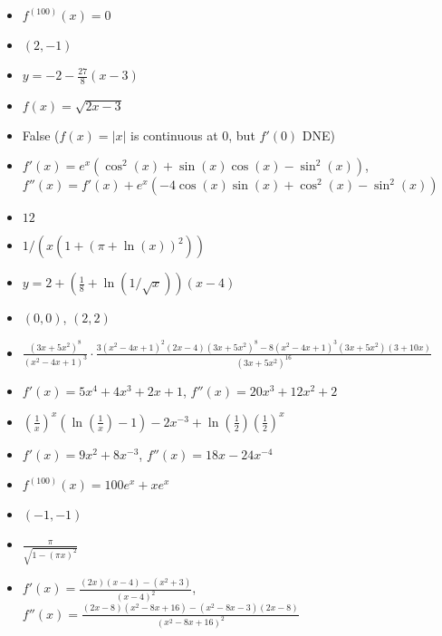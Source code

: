 \documentclass{article}
\begin{document}
\begin{itemize}
\item $f^{(100)}(x)=0$
\item $(2,-1)$
\item $y=-2-\frac{27}{8}(x-3)$
\item $f(x)=\sqrt{2x-3}$
\item False ($f(x)=|x|$ is continuous at $0$, but $f'(0)$ DNE)
\item $f'(x)=e^{x}(\cos^{2}(x)+\sin(x)\cos(x)-\sin^{2}(x))$, \\$f''(x)=f'(x)+e^{x}\left(-4\cos\left(x\right)\sin\left(x\right)+\cos^{2}\left(x\right)-\sin^{2}\left(x\right)\right)$
\item $12$
\item $1 / (x(1+(\pi+\ln(x))^2))$
\item $y=2+\left(\frac18+\ln(1/\sqrt{x})\right)(x-4)$
\item $(0,0)$, $(2,2)$
\item $\frac{(3x+5x^2)^8}{(x^2-4x+1)^3}\cdot\frac{3(x^2-4x+1)^2(2x-4)(3x+5x^2)^8-8(x^2-4x+1)^3(3x+5x^2)(3+10x)}{(3x+5x^2)^{16}}$
\item $f'(x)=5x^4+4x^3+2x+1$, $f''(x)=20x^3+12x^2+2$
\item $\left(\frac{1}{x}\right)^x\left(\ln\left(\frac{1}{x} \right) - 1\right)-2x^{-3}+\ln\left(\frac12\right)\left(\frac12\right)^x$
\item $f'(x)=9x^2+8x^{-3}$, $f''(x)=18x-24x^{-4}$
\item $f^{(100)}(x)=100e^x+xe^x$
\item $(-1,-1)$
\item $\frac{\pi}{\sqrt{1-(\pi x)^2}}$
\item $f'(x)=\frac{(2x)(x-4)-(x^2+3)}{(x-4)^2}$, $f''(x)=\frac{(2x-8)(x^2-8x+16)-(x^2-8x-3)(2x-8)}{(x^2-8x+16)^2}$
\end{itemize}
\end{document}
